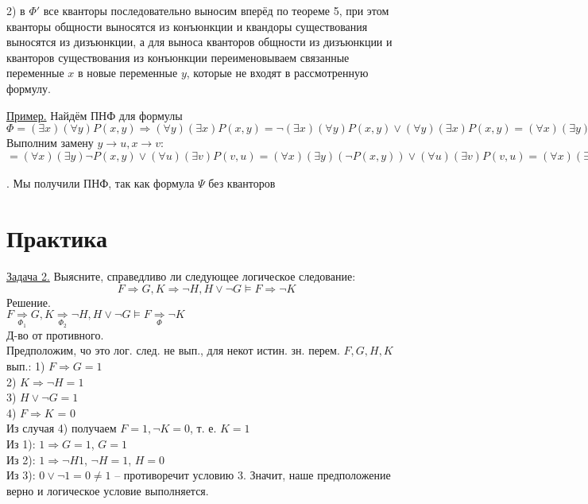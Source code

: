 2) в $\Phi'$ все кванторы последовательно выносим вперёд по теореме 5, при этом кванторы общности выносятся из конъюнкции и квандоры существования выносятся из дизъюнкции, а для выноса кванторов общности из дизъюнкции и кванторов существования из конъюнкции переименовываем связанные переменные $x$ в новые переменные $y$, которые не входят в рассмотренную формулу.

{\underline{Пример.}} Найдём ПНФ для формулы $\Phi = (\exists x)(\forall y)P(x, y) \Rightarrow (\forall y)(\exists x)P(x, y) = \neg(\exists x)(\forall y)P(x, y) \lor (\forall y)(\exists x)P(x, y) = (\forall x)(\exists y)\neg P(x, y) \lor (\forall y)(\exists x)P(x, y)$ \\
Выполним замену $y \rightarrow u, x \rightarrow v$: \\
$= (\forall x)(\exists y)\neg P(x, y)\lor(\forall u)(\exists v)P(v, u) = (\forall x)(\exists y)(\neg P(x, y))\lor(\forall u)(\exists v)P(v, u) = (\forall x)(\exists y)(\forall u)(\exists v)\underset{\Psi}{\underbrace{(\neg P(x,y) \lor P(v, u))}}$. Мы получили ПНФ, так как формула $\Psi$ без кванторов

\section{Практика}

\underline{Задача 2.}  Выясните, справедливо ли следующее логическое следование: 
\begin{equation*}
    F \Rightarrow G, K \Rightarrow \neg H, H \lor \neg G \vDash F \Rightarrow \neg K
\end{equation*}
Решение. \\
$F \underset{\Phi_1} \Rightarrow G, K \underset{\Phi_2} \Rightarrow \neg H, H \lor \neg G \vDash F \underset \Phi \Rightarrow \neg K$ \\
Д-во от противного. \\
Предположим, чо это лог. след. не вып., для некот истин. зн. перем. $F, G, H, K$ вып.:
1) $F \Rightarrow G = 1$ \\
2) $K \Rightarrow \neg H = 1$ \\
3) $H \lor \neg G = 1$ \\
4) $F \Rightarrow K$ = 0 \\
Из случая 4) получаем $F = 1, \neg K = 0$, т. е. $K = 1$ \\
Из 1): $1 \Rightarrow G = 1$, $G = 1$ \\
Из 2): $1 \Rightarrow \neg H 1$, $\neg H = 1$, $H = 0$ \\
Из 3): $0 \lor \neg 1 = 0 \neq 1$ -- противоречит условию 3. Значит, наше предположение верно и логическое условие выполняется.


